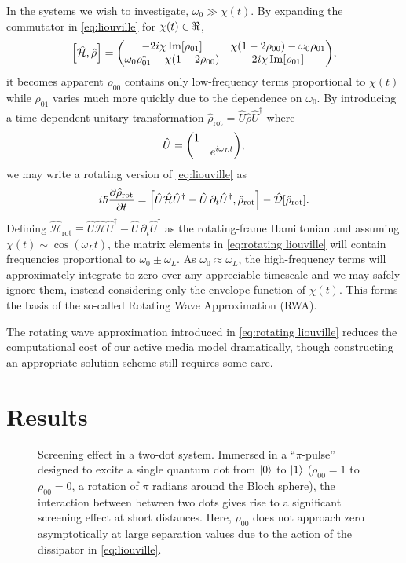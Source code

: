 \documentclass[conference]{IEEEtran}
\begin{document}
In the systems we wish to investigate, $\omega_0 \gg \chi(t)$. By expanding the commutator in \cref{eq:liouville} for $\chi(t) \in \real$,
\begin{equation}
  \commutator{\hat{\mathcal{H}}}{\hat{\rho}} =
  \mqty(
    -2 i \chi \Im[\rho_{01}] & \chi\qty(1 - 2 \rho_{00}) - \omega_0 \rho_{01} \\
    \omega_0 \rho_{01}^* - \chi\qty(1 - 2\rho_{00}) & 2 i \chi \Im[\rho_{01}]
  ),
\end{equation}
it becomes apparent $\rho_{00}$ contains only low-frequency terms proportional to $\chi(t)$ while $\rho_{01}$ varies much more quickly due to the dependence on $\omega_0$.
By introducing a time-dependent unitary transformation $\hat{\rho}_\text{rot} = \hat{U}\hat{\rho}\hat{U}^\dagger$ where
\begin{equation}
  \hat{U} = \mqty(\dmat{1, e^{i \omega_L t}}),
  \label{eq:unitary transformation}
\end{equation}
we may write a rotating version of \cref{eq:liouville} as
\begin{equation}
  i \hbar \pdv{\hat{\rho}_\text{rot}}{t} = \commutator{\hat{U} \hat{\mathcal{H}} \hat{U}^\dagger - \hat{U} \, \partial_t \hat{U}^\dagger}{\hat{\rho}_\text{rot}} - \hat{\mathcal{D}}[\hat{\rho}_\text{rot}].
  \label{eq:rotating liouville}
\end{equation}
Defining $\hat{\mathcal{H}}_\text{rot} \equiv \hat{U} \hat{\mathcal{H}} \hat{U}^\dagger - \hat{U} \, \partial_t \hat{U}^\dagger$ as the rotating-frame Hamiltonian and assuming $\chi(t) \sim \cos(\omega_L t)$, the matrix elements in \cref{eq:rotating liouville} will contain frequencies proportional to $\omega_0 \pm \omega_L$.
As $\omega_0 \approx \omega_L$, the high-frequency terms will approximately integrate to zero over any appreciable timescale and we may safely ignore them, instead considering only the envelope function of $\chi(t)$. This forms the basis of the so-called Rotating Wave Approximation (RWA)\cite{Allen1987}.


The rotating wave approximation introduced in \cref{eq:rotating liouville} reduces the computational cost of our active media model dramatically, though constructing an appropriate solution scheme still requires some care.


\section{Results}

\begin{figure}
  \centering
  
  \caption{\label{fig:screening} Screening effect in a two-dot system.
  Immersed in a ``$\pi$-pulse'' designed to excite a single quantum dot from $\ket{0}$ to $\ket{1}$ ($\rho_{00} = 1$ to $\rho_{00} = 0$, a rotation of $\pi$ radians around the Bloch sphere), the interaction between between two dots gives rise to a significant screening effect at short distances.
  Here, $\rho_{00}$ does not approach zero asymptotically at large separation values due to the action of the dissipator in \cref{eq:liouville}.
  }
\end{figure}
\end{document}
